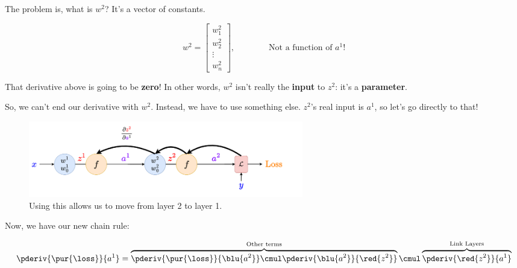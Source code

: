         The problem is, what is $w^2$? It's a vector of constants.
        
        \begin{equation}
            w^2 = 
            \begin{bmatrix}
                    w_1^2 \\ w_2^2 \\ \vdots \\ w_n^2
            \end{bmatrix}
            ,
            \qquad
            \qquad
            \text{Not a function of $a^1$!}
        \end{equation}
        
        That derivative above is going to be \textbf{zero}! In other words, $w^2$ isn't really the \textbf{input} to $z^2$: it's a \textbf{parameter}.
            
        So, we can't end our derivative with $w^2$. Instead, we have to use something else. $z^2$'s real input is $a^1$, so let's go directly to that!
        
        \begin{figure}[H]
            \centering
            \includegraphics[width=120mm,scale=0.4]{images/nn_1_5_images/two_neurons_inside_bp3.png}
            \caption*{Using this allows us to move from layer 2 to layer 1.}
        \end{figure}
        
        Now, we have our new chain rule:
        
        \begin{equation}
            \pderiv {\pur{\loss}} {a^1} 
            =
            \overbrace{
                \pderiv {\pur{\loss}} {\blu{a^2}} 
                    \cmul
                \pderiv {\blu{a^2}}   {\red{z^2}}
            }^{\text{Other terms} } 
                \cmul
            \overbrace{
                \pderiv {\red{z^2}}   {a^1}
            }^{\text{Link Layers}}
        \end{equation}
        
